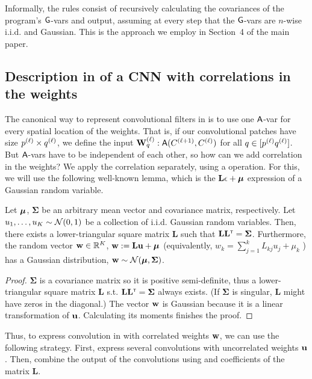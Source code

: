 \documentclass[tablecaption=bottom,wcp,nonatbib]{jmlr} %
\newcommand{\vL}{\mathbf{L}}
\newcommand{\vSigma}{\boldsymbol{\Sigma}}
\newcommand{\tp}{{\mathrm{\textsf{\tiny T}}}}
\begin{document}
{ Informally, the rules consist of recursively calculating the covariances
of the
program's $\mathsf{G}$-vars and output, assuming at every step that the $\mathsf{G}$-vars are $n$-wise
i.i.d. and Gaussian. This is the approach we employ in Section~4 %
of the main paper.

\subsection{Description in \Netsor of a CNN with correlations in the weights\label{sec:netsor-program}}
The canonical way to represent
convolutional filters in \Netsor \citep[\Netsor program 4]{yang2019wide} is to
use one $\mathsf{A}$-var for every spatial location
of the weights. That is, if our convolutional patches have size $p^{(\ell)} \times q^{(\ell)}$,
we define the input $\mathbf{W}^{(\ell)}_q: \mathsf{A}(C^{(\ell+1)}, C^{(\ell)})$ for
all $q \in [p^{(\ell)}q^{(\ell)}]$. But $\mathsf{A}$-vars have to be independent
of each other, so how can we add correlation in the weights? We apply the
correlation separately, using a \LinComb operation. For this, we will use the
following well-known lemma, which is the $\vL\epsilon + \vmu$ expression of a
Gaussian random variable.

\begin{lemma}
  Let $\boldsymbol{\mu}$, $\vSigma$ be an arbitrary mean vector and covariance matrix, respectively.
  Let $u_1,\dots,u_K \sim \NormDist{0, 1}$ be a collection of i.i.d. Gaussian
  random variables. Then, there exists a lower-triangular square matrix 
  $\vL$ such that $\vL\vL^\tp = \vSigma$.
  Furthermore, the random vector $\mathbf{w} \in \mathbb{R}^K$, $\vw \eqdef \vL\vu + \vmu$ (equivalently, $w_k
  = \sum_{j=1}^kL_{kj}u_j + \mu_k$ ) has a Gaussian distribution, $\vw \sim \NormDist{\vmu, \vSigma}$.
  \label{lemma:L}
\end{lemma}
\begin{proof}
  $\vSigma$ is a covariance matrix so it is positive semi-definite, thus
  a lower-triangular square matrix $\vL$ s.t. $\vL\vL^\tp = \vSigma$ always exists. (If
  $\vSigma$ is singular, $\vL$
  might have zeros in the diagonal.) The vector $\mathbf{w}$ is Gaussian because it is
  a linear transformation of $\mathbf{u}$. Calculating its moments finishes the proof.
\end{proof}
Thus, to express convolution in \Netsor with correlated weights $\mathbf{w}$, we can use the
following strategy. First, express several convolutions with uncorrelated
weights $\mathbf{u}$. Then, combine the output of the convolutions using \LinComb and coefficients of
the matrix $\vL$.

}
\end{document}
